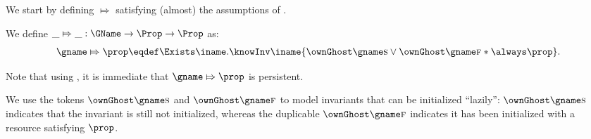 
We start by defining $\Mapsto$ satisfying (almost) the assumptions of .
%
\begin{defn}
We define $\_ \Mapsto \_ : \GName \to \Prop \to \Prop$ as:
%
\begin{align*}
  \gname \Mapsto \prop \eqdef \Exists \iname. \knowInv \iname {\ownGhost \gname \starttoken \lor \ownGhost \gname \finishtoken * \always \prop}.
\end{align*}
\end{defn}
Note that using , it is immediate that $\gname \Mapsto \prop$ is persistent.

We use the tokens $\ownGhost \gname \starttoken$ and $\ownGhost \gname \finishtoken$ to model invariants that can be initialized ``lazily'': $\ownGhost \gname \starttoken$ indicates that the invariant is still not initialized, whereas the duplicable $\ownGhost \gname \finishtoken$ indicates it has been initialized with a resource satisfying $\prop$.%


